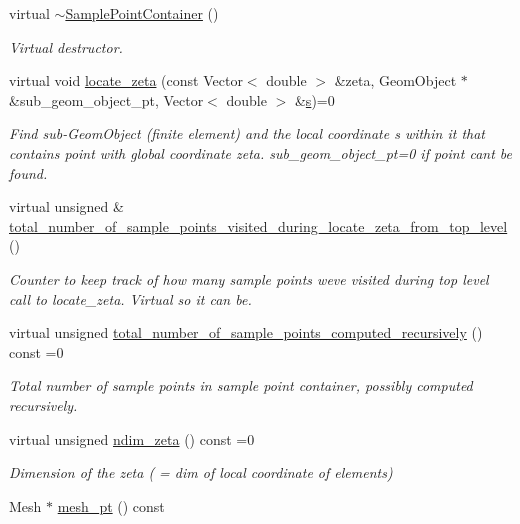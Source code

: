 \begin{DoxyCompactItemize}
virtual \hyperlink{classSamplePointContainer_a753a58798c528e01d384a4f444368db3}{$\sim$\+Sample\+Point\+Container} ()
\begin{DoxyCompactList}\small\item\em Virtual destructor. \end{DoxyCompactList}\item 
virtual void \hyperlink{classSamplePointContainer_acca8dbae8346d6c8924b1f815aa5f049}{locate\+\_\+zeta} (const Vector$<$ double $>$ \&zeta, Geom\+Object $\ast$\&sub\+\_\+geom\+\_\+object\+\_\+pt, Vector$<$ double $>$ \&\hyperlink{cfortran_8h_ab7123126e4885ef647dd9c6e3807a21c}{s})=0
\begin{DoxyCompactList}\small\item\em Find sub-\/\+Geom\+Object (finite element) and the local coordinate s within it that contains point with global coordinate zeta. sub\+\_\+geom\+\_\+object\+\_\+pt=0 if point can\textquotesingle{}t be found. \end{DoxyCompactList}\item 
virtual unsigned \& \hyperlink{classSamplePointContainer_af05aff0424680eec183a5680c4d6d65f}{total\+\_\+number\+\_\+of\+\_\+sample\+\_\+points\+\_\+visited\+\_\+during\+\_\+locate\+\_\+zeta\+\_\+from\+\_\+top\+\_\+level} ()
\begin{DoxyCompactList}\small\item\em Counter to keep track of how many sample points we\textquotesingle{}ve visited during top level call to locate\+\_\+zeta. Virtual so it can be. \end{DoxyCompactList}\item 
virtual unsigned \hyperlink{classSamplePointContainer_ac7bf51a6987a9180c7715d6211fdbb46}{total\+\_\+number\+\_\+of\+\_\+sample\+\_\+points\+\_\+computed\+\_\+recursively} () const =0
\begin{DoxyCompactList}\small\item\em Total number of sample points in sample point container, possibly computed recursively. \end{DoxyCompactList}\item 
virtual unsigned \hyperlink{classSamplePointContainer_af2cfee8a92a28addb59a5533dfd138e7}{ndim\+\_\+zeta} () const =0
\begin{DoxyCompactList}\small\item\em Dimension of the zeta ( = dim of local coordinate of elements) \end{DoxyCompactList}\item 
Mesh $\ast$ \hyperlink{classSamplePointContainer_ae170916821b5f8f00255d251cd7f2d8c}{mesh\+\_\+pt} () const

\end{DoxyCompactItemize}
